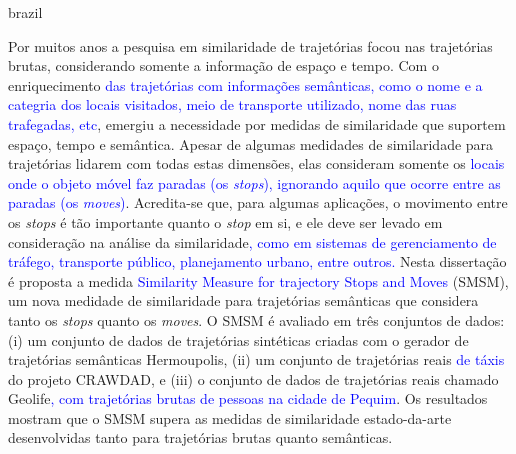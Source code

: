 \swapcontents
{
    \begin{otherlanguage*}{brazil}
    \begin{resumo}[Resumo]

        Por muitos anos a pesquisa em similaridade de trajetórias focou nas trajetórias brutas, considerando somente a informação de espaço e tempo. Com o enriquecimento \textcolor{blue}{das trajetórias com informações semânticas, como o nome e a categria dos locais visitados, meio de transporte utilizado, nome das ruas trafegadas, etc}, emergiu a necessidade por medidas de similaridade que suportem espaço, tempo e semântica. Apesar de algumas medidades de similaridade para trajetórias lidarem com todas estas dimensões, elas consideram somente os \textcolor{blue}{locais onde o objeto móvel faz paradas (os \emph{stops}), ignorando aquilo que ocorre entre as paradas (os \emph{moves})}.
        Acredita-se que, para algumas aplicações, o movimento entre os \emph{stops} é tão importante quanto o \emph{stop} em si, e ele deve ser levado em consideração na análise da similaridade\textcolor{blue}{, como em sistemas de gerenciamento de tráfego, transporte público, planejamento urbano, entre outros.}
        Nesta dissertação é proposta a medida \textcolor{blue}{Similarity Measure for trajectory Stops and Moves} (SMSM), um nova medidade de similaridade para trajetórias semânticas que considera tanto os \emph{stops} quanto os \emph{moves}.
        O SMSM é avaliado em três conjuntos de dados: (i) um conjunto de dados de trajetórias sintéticas criadas com o gerador de trajetórias semânticas Hermoupolis, (ii) um conjunto de trajetórias reais \textcolor{blue}{de táxis} do projeto CRAWDAD, e (iii) o conjunto de dados de trajetórias reais chamado Geolife\textcolor{blue}{, com trajetórias brutas de pessoas na cidade de Pequim}. Os resultados mostram que o SMSM supera as medidas de similaridade estado-da-arte desenvolvidas tanto para trajetórias brutas quanto semânticas.
        

    \end{resumo}
    \end{otherlanguage*}
}

